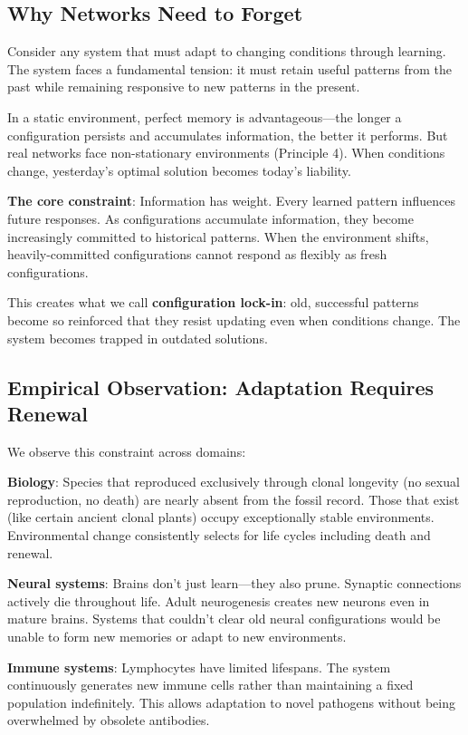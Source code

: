 \subsection{Why Networks Need to Forget}

Consider any system that must adapt to changing conditions through learning. The system faces a fundamental tension: it must retain useful patterns from the past while remaining responsive to new patterns in the present. 

In a static environment, perfect memory is advantageous—the longer a configuration persists and accumulates information, the better it performs. But real networks face non-stationary environments (Principle 4). When conditions change, yesterday's optimal solution becomes today's liability.

\textbf{The core constraint}: Information has weight. Every learned pattern influences future responses. As configurations accumulate information, they become increasingly committed to historical patterns. When the environment shifts, heavily-committed configurations cannot respond as flexibly as fresh configurations.

This creates what we call \textbf{configuration lock-in}: old, successful patterns become so reinforced that they resist updating even when conditions change. The system becomes trapped in outdated solutions.

\subsection{Empirical Observation: Adaptation Requires Renewal}

We observe this constraint across domains:

\textbf{Biology}: Species that reproduced exclusively through clonal longevity (no sexual reproduction, no death) are nearly absent from the fossil record. Those that exist (like certain ancient clonal plants) occupy exceptionally stable environments. Environmental change consistently selects for life cycles including death and renewal.

\textbf{Neural systems}: Brains don't just learn—they also prune. Synaptic connections actively die throughout life. Adult neurogenesis creates new neurons even in mature brains. Systems that couldn't clear old neural configurations would be unable to form new memories or adapt to new environments.

\textbf{Immune systems}: Lymphocytes have limited lifespans. The system continuously generates new immune cells rather than maintaining a fixed population indefinitely. This allows adaptation to novel pathogens without being overwhelmed by obsolete antibodies.

